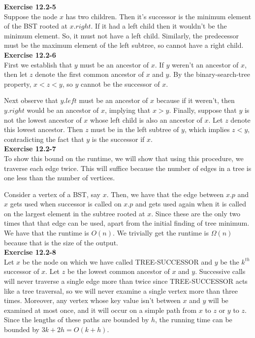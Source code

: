 \documentclass{article}
\begin{document}
\noindent\textbf{ Exercise 12.2-5} \\

Suppose the node $x$ has two children. Then it's successor is the minimum element of the BST rooted at $x.right$. If it had a left child then it wouldn't be the minimum element. So, it must not have a left child. Similarly, the predecessor must be the maximum element of the left subtree, so cannot have a right child.\\

\noindent\textbf{Exercise 12.2-6}\\

First we establish that $y$ must be an ancestor of $x$.  If $y$ weren't an ancestor of $x$, then let $z$ denote the first common ancestor of $x$ and $y$.  By the binary-search-tree property, $x < z < y$, so $y$ cannot be the successor of $x$.  

Next observe that $y.left$ must be an ancestor of $x$ because if it weren't, then $y.right$ would be an ancestor of $x$, implying that $x > y$.  Finally, suppose that $y$ is not the lowest ancestor of $x$ whose left child is also an ancestor of $x$.  Let $z$ denote this lowest ancestor. Then $z$ must be in the left subtree of $y$, which implies $z < y$, contradicting the fact that $y$ is the successor if $x$. \\

\noindent\textbf{ Exercise 12.2-7} \\

To show this bound on the runtime, we will show that using this procedure, we traverse each edge twice. This will suffice because the number of edges in a tree is one less than the number of vertices.

Consider a vertex of a BST, say $x$. Then, we have that the edge between $x.p$ and $x$ gets used when successor is called on $x.p$ and gets used again when it is called on the largest element in the subtree rooted at $x$. Since these are the only two times that that edge can be used, apart from the initial finding of tree minimum. We have that the runtime is $O(n)$. We trivially get the runtime is $\Omega(n)$ because that is the size of the output.\\

\noindent\textbf{Exercise 12.2-8}\\

Let $x$ be the node on which we have called TREE-SUCCESSOR and $y$ be the $k^{th}$ successor of $x$. Let $z$ be the lowest common ancestor of $x$ and $y$. Successive calls will never traverse a single edge more than twice since TREE-SUCCESSOR acts like a tree traversal, so we will never examine a single vertex more than three times. Moreover, any vertex whose key value isn't between $x$ and $y$ will be examined at most once, and it will occur on a simple path from $x$ to $z$ or $y$ to $z$. Since the lengths of these paths are bounded by $h$, the running time can be bounded by $3k + 2h = O(k+h)$.\\
\end{document}
